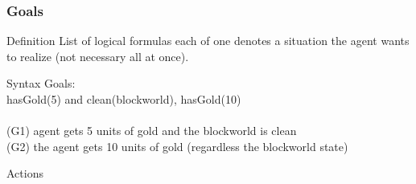 \documentclass{beamer}
\newcommand\tab[1][1cm]{\hspace*{#1}}
\begin{document}
\begin{frame}
\frametitle{Goals}
\begin{block}{Definition}
	List of logical formulas each of one denotes a situation the agent wants to realize (not necessary all at once).
\end{block}
\begin{block}{Syntax}
  Goals: \\
  \tab  hasGold(5) and clean(blockworld), hasGold(10) \\~\\
  (G1) agent gets 5 units of gold and the blockworld is clean \\ 
  (G2) the agent gets 10 units of gold (regardless the blockworld state)
\end{block}
\end{frame}

\begin{frame}
\Huge{\centerline{Actions}}
\end{frame}
\end{document}
